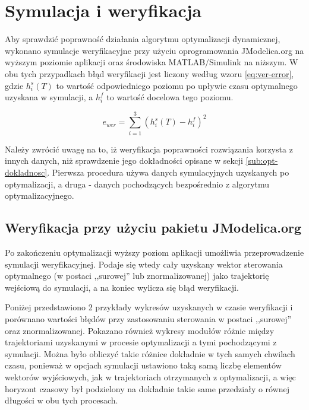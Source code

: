 \section{Symulacja i weryfikacja}
\label{sec:sym-wer}

Aby sprawdzić poprawność działania algorytmu optymalizacji dynamicznej, wykonano symulacje weryfikacyjne przy użyciu oprogramowania JModelica.org na wyższym poziomie aplikacji oraz środowiska MATLAB/Simulink na niższym.
W obu tych przypadkach błąd weryfikacji jest liczony według wzoru \ref{eq:ver-error}, gdzie $h_{i}^{s}(T)$ to wartość odpowiedniego poziomu po upływie czasu optymalnego uzyskana w symulacji, a $h_{i}^{f}$ to wartość docelowa tego poziomu.

\begin{equation}\label{eq:ver-error}
e_{wer} = \sum_{i=1}^{3} (h_{i}^{s}(T) - h_{i}^{f})^{2}
\end{equation}

Należy zwrócić uwagę na to, iż weryfikacja poprawności rozwiązania korzysta z innych danych, niż sprawdzenie jego dokładności opisane w sekcji \ref{sub:opt-dokladnosc}. Pierwsza procedura używa danych symulacyjnych uzyskanych po optymalizacji, a druga - danych pochodzących bezpośrednio z algorytmu optymalizacyjnego.

\subsection{Weryfikacja przy użyciu pakietu JModelica.org}
\label{sub:sym-wer-jmodelica}

Po zakończeniu optymalizacji wyższy poziom aplikacji umożliwia przeprowadzenie symulacji weryfikacyjnej. Podaje się wtedy cały uzyskany wektor sterowania optymalnego (w postaci ,,surowej'' lub znormalizowanej) jako trajektorię wejściową do symulacji, a na koniec wylicza się błąd weryfikacji.

Poniżej przedstawiono 2 przykłady wykresów uzyskanych w czasie weryfikacji i porównano wartości błędów przy zastosowaniu sterowania w postaci ,,surowej'' oraz znormalizowanej.
Pokazano również wykresy modułów różnic między trajektoriami uzyskanymi w procesie optymalizacji a tymi pochodzącymi z symulacji.
Można było obliczyć takie różnice dokładnie w tych samych chwilach czasu, ponieważ w opcjach symulacji ustawiono taką samą liczbę elementów wektorów wyjściowych, jak w trajektoriach otrzymanych z optymalizacji, a więc horyzont czasowy był podzielony na dokładnie takie same przedziały o równej długości w obu tych procesach.

